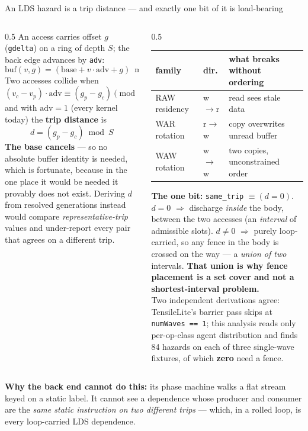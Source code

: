 \documentclass[aspectratio=169,9pt]{beamer}
\newcommand{\tsub}[1]{{\footnotesize\color{gray}#1}}
\newcommand{\key}[1]{\textcolor{acc}{\textbf{#1}}}
\newcommand{\bad}[1]{\textcolor{warn}{\textbf{#1}}}
\newcommand{\good}[1]{\textcolor{ok}{\textbf{#1}}}
\begin{document}
\begin{frame}{An LDS hazard is a trip distance --- and exactly one bit of it is load-bearing}
\footnotesize
\begin{columns}[T]
\begin{column}{0.5\textwidth}
An access carries offset $g$ (\texttt{gdelta}) on a ring of depth $S$; the back edge advances by \texttt{adv}:
\[ \mathrm{buf}(v,g) = (\text{base} + v\!\cdot\!\mathrm{adv} + g) \bmod S \]
Two accesses collide when
\[ (v_c - v_p)\cdot \mathrm{adv} \equiv (g_p - g_c) \pmod S \]
and with $\mathrm{adv}=1$ (every kernel today) the \key{trip distance} is
\[ d = (g_p - g_c) \bmod S \]
\good{The base cancels} --- so no absolute buffer identity is needed, which is fortunate, because in the one place
it would be needed it provably does not exist. Deriving $d$ from resolved generations instead would compare
\emph{representative-trip} values and under-report every pair that agrees on a different trip.
\end{column}
\begin{column}{0.5\textwidth}
\begin{center}\scriptsize
\begin{tabular}{@{}lll@{}}
\toprule
family & dir. & what breaks without ordering \\
\midrule
RAW \tsub{residency} & w$\to$r & read sees stale data \\
WAR \tsub{rotation} & r$\to$w & copy overwrites unread buffer \\
WAW \tsub{rotation} & w$\to$w & two copies, unconstrained order \\
\bottomrule
\end{tabular}
\end{center}
\vspace{2pt}
\textbf{The one bit:} \texttt{same\_trip} $\equiv (d=0)$.
$d=0$ $\Rightarrow$ discharge \emph{inside} the body, between the two accesses (an \emph{interval} of admissible
slots). $d\neq0$ $\Rightarrow$ purely loop-carried, so any fence in the body is crossed on the way --- a
\emph{union of two} intervals. \key{That union is why fence placement is a set cover and not a shortest-interval
problem.}\\[3pt]
\tsub{Two independent derivations agree: TensileLite's barrier pass skips at \texttt{numWaves == 1}; this analysis
reads only per-op-class agent distribution and finds 84 hazards on each of three single-wave fixtures, of which
\textbf{zero} need a fence.}
\end{column}
\end{columns}
\vspace{1mm}
\bad{Why the back end cannot do this:} its phase machine walks a flat stream keyed on a static label. It cannot see
a dependence whose producer and consumer are the \emph{same static instruction on two different trips} --- which,
in a rolled loop, is every loop-carried LDS dependence.
\end{frame}
\end{document}

